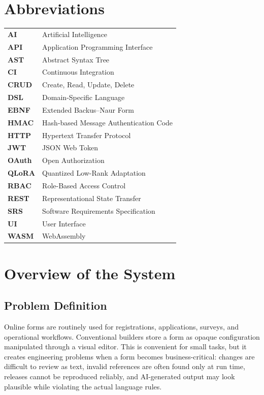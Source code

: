 \documentclass[12pt,a4paper,oneside]{report}
\begin{document}
\tableofcontents
\listoffigures
\listoftables
\lstlistoflistings

\chapter*{Abbreviations}
\begin{longtable}{>{\bfseries}p{}p{}}
AI & Artificial Intelligence\\
API & Application Programming Interface\\
AST & Abstract Syntax Tree\\
CI & Continuous Integration\\
CRUD & Create, Read, Update, Delete\\
DSL & Domain-Specific Language\\
EBNF & Extended Backus--Naur Form\\
HMAC & Hash-based Message Authentication Code\\
HTTP & Hypertext Transfer Protocol\\
JWT & JSON Web Token\\
OAuth & Open Authorization\\
QLoRA & Quantized Low-Rank Adaptation\\
RBAC & Role-Based Access Control\\
REST & Representational State Transfer\\
SRS & Software Requirements Specification\\
UI & User Interface\\
WASM & WebAssembly\\
\end{longtable}

\clearpage
{}
\setcounter{page}{1}

\chapter{Overview of the System}

\section{Problem Definition}
Online forms are routinely used for registrations, applications, surveys, and operational
workflows. Conventional builders store a form as opaque configuration manipulated through a
visual editor. This is convenient for small tasks, but it creates engineering problems when a
form becomes business-critical: changes are difficult to review as text, invalid references are
often found only at run time, releases cannot be reproduced reliably, and AI-generated output
may look plausible while violating the actual language rules.
\end{document}
